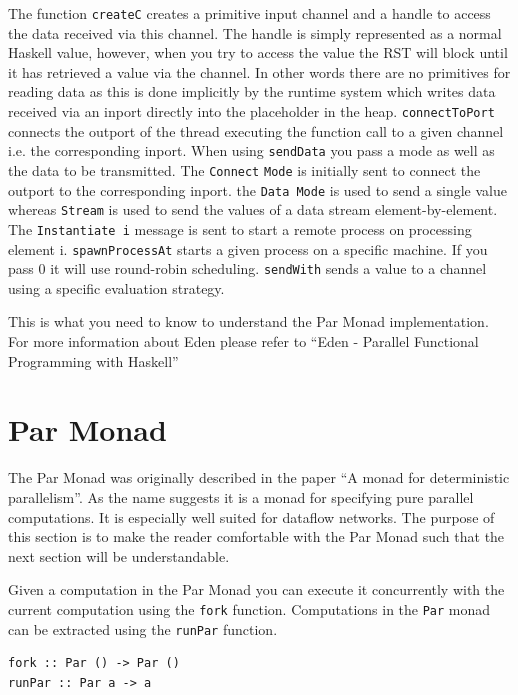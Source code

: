 \documentclass[a4paper, oneside, final]{memoir}
\begin{document}
The function \texttt{createC} creates a primitive input channel and a
handle to access the data received via this channel. The handle is
simply represented as a normal Haskell value, however, when you try to
access the value the RST will block until it has retrieved a value via
the channel. In other words there are no primitives for reading data
as this is done implicitly by the runtime system which writes data
received via an inport directly into the placeholder in the heap.
\texttt{connectToPort} connects the outport of the thread executing
the function call to a given channel i.e. the corresponding inport.
When using \texttt{sendData} you pass a mode as well as the data to be
transmitted. The \texttt{Connect} \texttt{Mode} is initially sent to
connect the outport to the corresponding inport. the \texttt{Data
Mode} is used to send a single value whereas \texttt{Stream} is used
to send the values of a data stream element-by-element. The
\texttt{Instantiate i} message is sent to start a remote process on
processing element i.  \texttt{spawnProcessAt} starts a given process
on a specific machine.  If you pass 0 it will use round-robin
scheduling. \texttt{sendWith}  sends a value to a channel using a
specific evaluation strategy.

This is what you need to know to understand the Par Monad
implementation. For more information about Eden please refer
to ``Eden - Parallel Functional Programming with Haskell''\cite{eden}

\section{Par Monad}
\label{sec:parmonad}

The Par Monad was originally described in the paper ``A monad for deterministic parallelism''\cite{parmonad}. As the name suggests it is a monad for specifying pure parallel computations. It is especially well suited for dataflow networks. The purpose of this section is to make the reader comfortable with the Par Monad such that the next section will be understandable.

Given a computation in the Par Monad you can execute it concurrently with the current computation using the \texttt{fork} function. Computations in the \texttt{Par} monad can be extracted using the \texttt{runPar} function. \newline

\begin{lstlisting}
fork :: Par () -> Par ()
runPar :: Par a -> a
\end{lstlisting}
\end{document}
